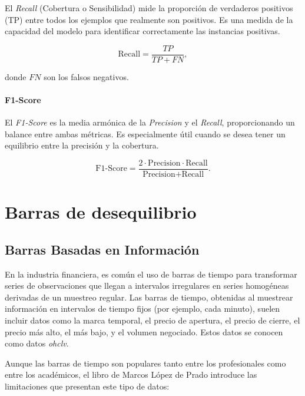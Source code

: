 \documentclass[a4paper,12pt, twoside]{report}
\begin{document}
El \textit{Recall} (Cobertura o Sensibilidad) mide la proporción de verdaderos positivos (TP) entre todos los ejemplos que realmente son positivos. Es una medida de la capacidad del modelo para identificar correctamente las instancias positivas.

\begin{equation}
\text{Recall} = \frac{TP}{TP + FN},
\end{equation}

donde $FN$ son los falsos negativos.

\subsubsection{F1-Score}

El \textit{F1-Score} es la media armónica de la \textit{Precision} y el \textit{Recall}, proporcionando un balance entre ambas métricas. Es especialmente útil cuando se desea tener un equilibrio entre la precisión y la cobertura.

\begin{equation}
\text{F1-Score} = \frac{2 \cdot \text{Precision} \cdot \text{Recall}}{\text{Precision} + \text{Recall}}.
\end{equation}


\chapter{Barras de desequilibrio}

\section{Barras Basadas en Información}

En la industria financiera, es común el uso de barras de tiempo para transformar 
series de observaciones que llegan a intervalos irregulares en series homogéneas 
derivadas de un muestreo regular. Las barras de tiempo, obtenidas al muestrear 
información en intervalos de tiempo fijos (por ejemplo, cada minuto), suelen incluir 
datos como la marca temporal, el precio de apertura, el precio de cierre, el precio 
más alto, el más bajo, y el volumen negociado. Estos datos se conocen como datos \textit{ohclv}.

Aunque las barras de tiempo son populares tanto entre los profesionales como entre los académicos, 
el libro de Marcos López de Prado introduce las limitaciones que presentan este tipo de datos:
\end{document}
